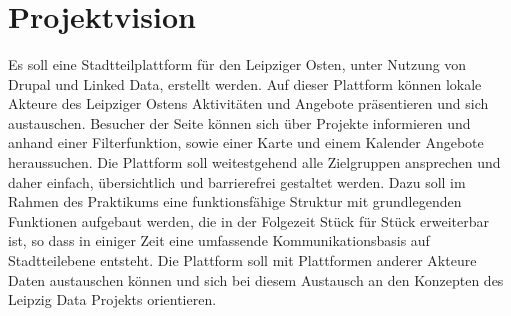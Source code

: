 \documentclass{swp}
\begin{document}
\\\\\\\\\\

\tableofcontents
\newpage
\section{Projektvision}
Es soll eine Stadtteilplattform f\"ur den Leipziger Osten, unter Nutzung von Drupal und Linked Data, erstellt werden. Auf dieser Plattform k\"onnen lokale Akteure des Leipziger Ostens Aktivit\"aten und Angebote pr\"asentieren und sich austauschen. Besucher der Seite k\"onnen sich \"uber Projekte informieren und anhand einer Filterfunktion, sowie einer Karte und einem Kalender Angebote heraussuchen. Die Plattform soll weitestgehend alle Zielgruppen ansprechen und daher einfach, \"ubersichtlich und barrierefrei gestaltet werden. Dazu soll im Rahmen des Praktikums eine funktionsf\"ahige Struktur mit grundlegenden Funktionen aufgebaut werden, die in der Folgezeit St\"uck f\"ur St\"uck erweiterbar ist, so dass in einiger Zeit eine umfassende Kommunikationsbasis auf Stadtteilebene entsteht. Die Plattform soll mit Plattformen anderer Akteure Daten austauschen k\"onnen und sich bei diesem Austausch an den Konzepten des Leipzig Data Projekts orientieren.
\end{document}
